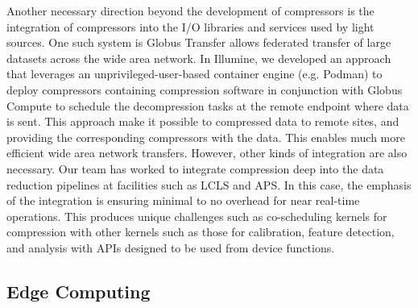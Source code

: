Another necessary direction beyond the development of compressors is the integration of compressors into the I/O libraries and services used by light sources.
One such system is Globus Transfer \cite{fosterGlobusMetacomputingInfrastructure1997} allows federated transfer of large datasets across the wide area network.
In Illumine, we developed an approach that leverages an unprivileged-user-based container engine (e.g. Podman)  to deploy compressors containing compression software in conjunction with Globus Compute to schedule the decompression tasks at the remote endpoint where data is sent.
This approach make it possible to compressed data to remote sites, and providing the corresponding compressors with the data.
This enables much more efficient wide area network transfers.
However, other kinds of integration are also necessary.
Our team has worked to integrate compression deep into the data reduction pipelines at facilities such as LCLS and APS.
In this case, the emphasis of the integration is ensuring minimal to no overhead for near real-time operations.
This produces unique challenges such as co-scheduling kernels for compression with other kernels such as those for calibration, feature detection, and analysis with APIs designed to be used from device functions.

\subsection{Edge Computing}

